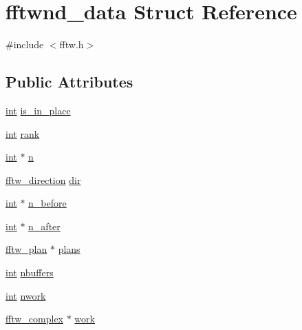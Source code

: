 \hypertarget{structfftwnd__data}{}\section{fftwnd\+\_\+data Struct Reference}
\label{structfftwnd__data}


{\ttfamily \#include $<$fftw.\+h$>$}

\subsection*{Public Attributes}
\begin{DoxyCompactItemize}
\item 
\hyperlink{xmltok_8h_a5a0d4a5641ce434f1d23533f2b2e6653}{int} \hyperlink{structfftwnd__data_ad93f931868ab59241f4accb107a094a9}{is\+\_\+in\+\_\+place}
\item 
\hyperlink{xmltok_8h_a5a0d4a5641ce434f1d23533f2b2e6653}{int} \hyperlink{structfftwnd__data_a45c88cd0e574357ba13a671a94ce6adb}{rank}
\item 
\hyperlink{xmltok_8h_a5a0d4a5641ce434f1d23533f2b2e6653}{int} $\ast$ \hyperlink{structfftwnd__data_a3fa54e48b6012a8ad3075d261165e9ba}{n}
\item 
\hyperlink{fftw_8h_addfba51b1dc43e3660873b1ba9668cec}{fftw\+\_\+direction} \hyperlink{structfftwnd__data_af6539f7692dda806b475e2601063155f}{dir}
\item 
\hyperlink{xmltok_8h_a5a0d4a5641ce434f1d23533f2b2e6653}{int} $\ast$ \hyperlink{structfftwnd__data_aaee96deb92bd226d350c5a57d6cd8ac6}{n\+\_\+before}
\item 
\hyperlink{xmltok_8h_a5a0d4a5641ce434f1d23533f2b2e6653}{int} $\ast$ \hyperlink{structfftwnd__data_af2a9cac8bde7f13738a40e00a3536f6c}{n\+\_\+after}
\item 
\hyperlink{fftw_8h_a4bd55d67f7b6fd1a3951c3ec0b677b8c}{fftw\+\_\+plan} $\ast$ \hyperlink{structfftwnd__data_ae4f62c58612bb6ee7b6b2b056f7fc0a2}{plans}
\item 
\hyperlink{xmltok_8h_a5a0d4a5641ce434f1d23533f2b2e6653}{int} \hyperlink{structfftwnd__data_a5d44d57b6fea0744dee38c0fe668c256}{nbuffers}
\item 
\hyperlink{xmltok_8h_a5a0d4a5641ce434f1d23533f2b2e6653}{int} \hyperlink{structfftwnd__data_a032d7302d54a092ed1ca74f6392d52b1}{nwork}
\item 
\hyperlink{structfftw__complex}{fftw\+\_\+complex} $\ast$ \hyperlink{structfftwnd__data_a5d41dc9033beffa4d941c3dae155a862}{work}
\end{DoxyCompactItemize}


